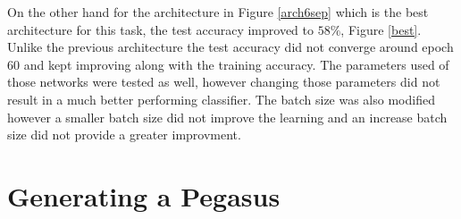 \documentclass[11pt]{article}
\begin{document}
    On the other hand for the architecture in Figure \ref{arch6sep} which is the best architecture for this task, the test accuracy improved to $58\%$, Figure \ref{best}. Unlike the previous architecture the test accuracy did not converge around epoch 60 and kept improving along with the training accuracy. The parameters used of those networks were tested as well, however changing those parameters did not result in a much better performing classifier. The batch size was also modified however a smaller batch size did not improve the learning and an increase batch size did not provide a greater improvment.

    \section*{Generating a Pegasus}
    

    
\end{document}
